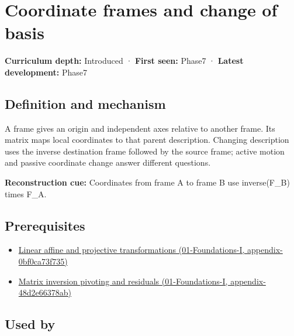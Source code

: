 \hypertarget{appendix-1bae9457dbc3}{}
\section{Coordinate frames and change of basis}\label{appendix-1bae9457dbc3-coordinate-frames-and-change-of-basis}

\textbf{Curriculum depth:} Introduced · \textbf{First seen:} Phase7 · \textbf{Latest development:} Phase7

\subsection{Definition and mechanism}\label{appendix-1bae9457dbc3-definition-and-mechanism}

A frame gives an origin and independent axes relative to another frame. Its matrix maps local coordinates to that parent description. Changing description uses the inverse destination frame followed by the source frame; active motion and passive coordinate change answer different questions.

\textbf{Reconstruction cue:} Coordinates from frame A to frame B use inverse(F\_B) times F\_A.

\subsection{Prerequisites}\label{appendix-1bae9457dbc3-prerequisites}

\begin{itemize}
\tightlist
\item
  \href{../01-Foundations-I/main.pdf\#nameddest=appendix-0bf0ca73f735}{Linear affine and projective transformations (01-Foundations-I, appendix-0bf0ca73f735)}
\item
  \href{../01-Foundations-I/main.pdf\#nameddest=appendix-48d2e66378ab}{Matrix inversion pivoting and residuals (01-Foundations-I, appendix-48d2e66378ab)}
\end{itemize}

\subsection{Used by}\label{appendix-1bae9457dbc3-used-by}

